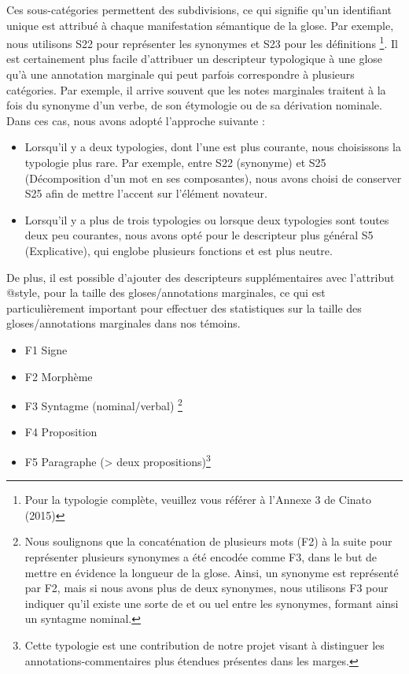 \documentclass[a4paper, twoside, 12pt]{book}
\begin{document}
Ces sous-catégories permettent des subdivisions, ce qui signifie qu'un identifiant unique est attribué à chaque manifestation sémantique de la glose. Par exemple, nous utilisons S22 pour représenter les synonymes et S23 pour les définitions \footnote{Pour la typologie complète, veuillez vous référer à l'Annexe 3 de Cinato (2015)}. Il est certainement plus facile d'attribuer un descripteur typologique à une glose qu'à une annotation marginale qui peut parfois correspondre à plusieurs catégories. Par exemple, il arrive souvent que les notes marginales traitent à la fois du synonyme d'un verbe, de son étymologie ou de sa dérivation nominale. Dans ces cas, nous avons adopté l'approche suivante :
\begin{itemize}
\item Lorsqu'il y a deux typologies, dont l'une est plus courante, nous choisissons la typologie plus rare. Par exemple, entre S22 (synonyme) et S25 (Décomposition d'un mot en ses composantes), nous avons choisi de conserver S25 afin de mettre l'accent sur l'élément novateur.
\item Lorsqu'il y a plus de trois typologies ou lorsque deux typologies sont toutes deux peu courantes, nous avons opté pour le descripteur plus général S5 (Explicative), qui englobe plusieurs fonctions et est plus neutre.
\end{itemize}

De plus, il est possible d'ajouter des descripteurs supplémentaires avec l'attribut @style, pour la taille des gloses/annotations marginales, ce qui est particulièrement important pour effectuer des statistiques sur la taille des gloses/annotations marginales dans nos témoins.\\

\begin{itemize}
\item F1 Signe
\item F2 Morphème
\item F3 Syntagme (nominal/verbal) \footnote{Nous soulignons que la concaténation de plusieurs mots (F2) à la suite pour représenter plusieurs synonymes a été encodée comme F3, dans le but de mettre en évidence la longueur de la glose. Ainsi, un synonyme est représenté par F2, mais si nous avons plus de deux synonymes, nous utilisons F3 pour indiquer qu'il existe une sorte de \og{}et\fg{} ou \og{}uel\fg{} entre les synonymes, formant ainsi un syntagme nominal.}
\item F4 Proposition
\item F5 Paragraphe (> deux propositions)\footnote{Cette typologie est une contribution de notre projet visant à distinguer les annotations-commentaires plus étendues présentes dans les marges.}
\end{itemize}
\end{document}
